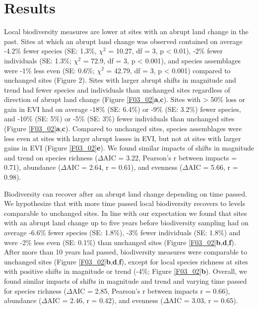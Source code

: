 \section{Results}
Local biodiversity measures are lower at sites with an abrupt land change in the past. Sites at which an abrupt land change was observed contained on average -4.2\% fewer species (SE: 1.3\%, $\chi^2$ = 10.27, df = 3, p < 0.01), -2\% fewer individuals (SE: 1.3\%; $\chi^2$ = 72.9, df = 3, p < 0.001), and species assemblages were -1\% less even (SE: 0.6\%; $\chi^2$ = 42.79, df = 3, p < 0.001) compared to unchanged sites (Figure 2). Sites with larger abrupt shifts in magnitude and trend had fewer species and individuals than unchanged sites regardless of direction of abrupt land change (Figure \ref{F03_02}\textbf{a},\textbf{c}). Sites with > 50\% loss or gain in EVI had on average -18\% (SE: 6.4\%) or -9\% (SE: 3.2\%) fewer species, and -10\% (SE: 5\%) or -5\% (SE: 3\%) fewer individuals than unchanged sites (Figure \ref{F03_02}\textbf{a},\textbf{c}). Compared to unchanged sites, species assemblages were less even at sites with larger abrupt losses in EVI, but not at sites with larger gains in EVI (Figure \ref{F03_02}\textbf{e}). We found similar impacts of shifts in magnitude and trend on species richness ($\Delta$AIC = 3.22, Pearson’s r between impacts = 0.71), abundance ($\Delta$AIC = 2.64, r = 0.61), and evenness ($\Delta$AIC = 5.66, r = 0.98).

Biodiversity can recover after an abrupt land change depending on time passed. We hypothesize that with more time passed local biodiversity recovers to levels comparable to unchanged sites. In line with our expectation we found that sites with an abrupt land change up to five years before biodiversity sampling had on average -6.6\% fewer species (SE: 1.8\%), -3\% fewer individuals (SE: 1.8\%) and were -2\% less even (SE: 0.1\%) than unchanged sites (Figure \ref{F03_02}\textbf{b},\textbf{d},\textbf{f}). After more than 10 years had passed, biodiversity measures were comparable to unchanged sites (Figure \ref{F03_02}\textbf{b},\textbf{d},\textbf{f}), except for local species richness at sites with positive shifts in magnitude or trend (-4\%; Figure \ref{F03_02}\textbf{b}). Overall, we found similar impacts of shifts in magnitude and trend and varying time passed for species richness ($\Delta$AIC = 2.85, Pearson’s r between impacts r = 0.66), abundance ($\Delta$AIC = 2.46, r = 0.42), and evenness ($\Delta$AIC = 3.03, r = 0.65).

